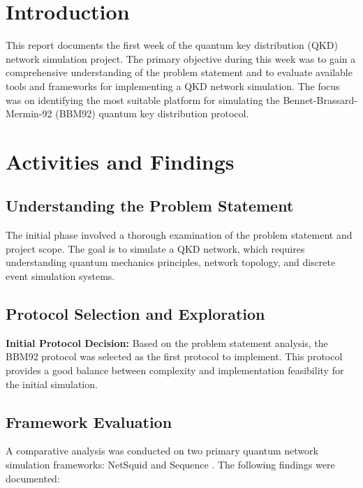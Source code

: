 \doublespacing
\thispagestyle{fancy}



\section{Introduction}

This report documents the first week of the quantum key distribution (QKD) network simulation project. The primary objective during this week was to gain a comprehensive understanding of the problem statement and to evaluate available tools and frameworks for implementing a QKD network simulation. The focus was on identifying the most suitable platform for simulating the Bennet-Brassard-Mermin-92 (BBM92) \cite{BBM92Paper} quantum key distribution protocol.

\section{Activities and Findings}

\subsection{Understanding the Problem Statement}

The initial phase involved a thorough examination of the problem statement and project scope. The goal is to simulate a QKD network, which requires understanding quantum mechanics principles, network topology, and discrete event simulation systems.

\subsection{Protocol Selection and Exploration}

\textbf{Initial Protocol Decision:} Based on the problem statement analysis, the BBM92 protocol was selected as the first protocol to implement. This protocol provides a good balance between complexity and implementation feasibility for the initial simulation.

\subsection{Framework Evaluation}

A comparative analysis was conducted on two primary quantum network simulation frameworks: NetSquid \cite{NetSquidTutorial} and Sequence \cite{SequenceTutorial}. The following findings were documented:

